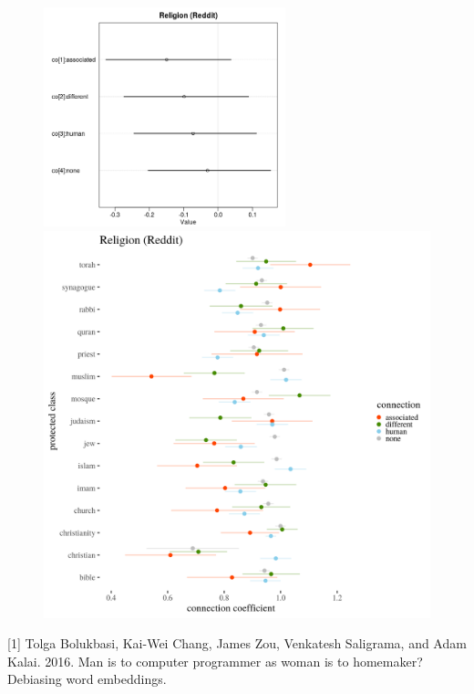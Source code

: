 \documentclass[12pt,dvipsnames,enabledeprecatedfontcommands]{scrartcl}
\begin{document}
\begin{center}
\begin{figure}[!htb]
   
  \begin{minipage}{0.38\textwidth}
\includegraphics[width=7cm]{../images/religionCoeffs.jpeg}
\end{minipage}
   \begin {minipage}{0.58\textwidth}
\includegraphics{../images/visReligionReddit.png}
   \end{minipage}
\end{figure}


\end{center}

\scriptsize 

\vspace{-4mm}

\hypertarget{refs}{}
\hypertarget{ref-bolukbasi2016man}{}
{[}1{]} Tolga Bolukbasi, Kai-Wei Chang, James Zou, Venkatesh Saligrama,
and Adam Kalai. 2016. Man is to computer programmer as woman is to
homemaker? Debiasing word embeddings.
\end{document}
